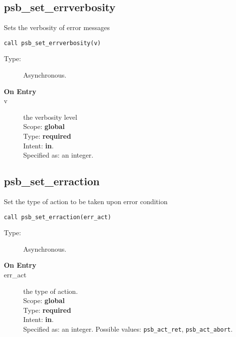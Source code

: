 \clearpage\subsection{psb\_set\_errverbosity}{Sets the verbosity of error
  messages}


\begin{lstlisting}
call psb_set_errverbosity(v)
\end{lstlisting}

\begin{description}
\item[Type:] Asynchronous.
\item[\bf On Entry]
\item[v] the verbosity level\\
Scope: {\bf global}\\
Type: {\bf required}\\
Intent: {\bf in}.\\
Specified as: an integer.
\end{description}

\clearpage\subsection{psb\_set\_erraction}{Set the type of action to be
  taken  upon error condition}

\begin{lstlisting}
call psb_set_erraction(err_act)
\end{lstlisting}

\begin{description}
\item[Type:] Asynchronous.
\item[\bf On Entry]
\item[err\_act] the type of action.\\
Scope: {\bf global} \\
Type: {\bf required}\\
Intent: {\bf in}.\\
Specified as: an integer. Possible values: \verb|psb_act_ret|,
\verb|psb_act_abort|. 
\end{description}


